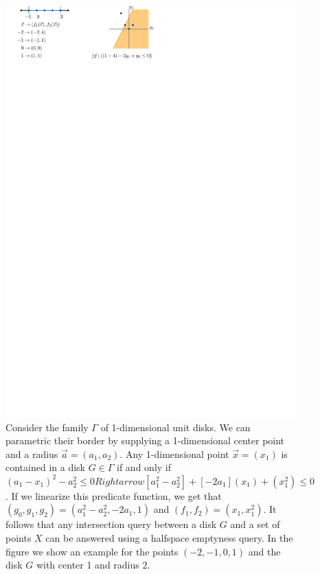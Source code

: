 \documentclass[UKenglish]{lipics-v2019}
\begin{document}
\begin{figure}[tb]
    \centering
    \includegraphics{../algebraic}
    \caption{Consider the family $\Gamma$ of 1-dimensional unit disks. We can parametric their border by supplying a 1-dimensional center point and a radius $\vec{a}=(a_1, a_2)$. Any 1-dimensional point $\vec{x} = (x_1)$ is contained in a disk $G \in \Gamma$ if and only if $(a_1 - x_1)^2 - a_2^2 \le 0 Rightarrow [a_1^2 - a_2^2] + [-2a_1](x_1) + (x_1^2) \le 0$. If we linearize this predicate function, we get that $(g_0, g_1, g_2) = (a_1^2 - a_2^2, -2a_1, 1)$  and $(f_1, f_2) = (x_1, x_1^2)$. It follows that any intersection query between a disk $G$ and a set of points $X$ can be answered using a halfspace emptyness query. In the figure we show an example for the points $(-2, -1, 0, 1)$ and the disk $G$ with center 1 and radius 2. }
    \label{fig:algebraic}
\end{figure}
\end{document}
